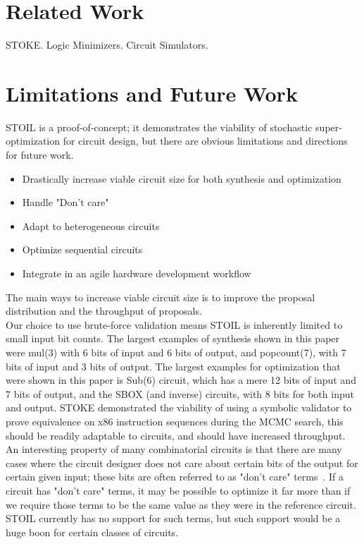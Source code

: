 \documentclass{article}
\begin{document}
\section{Related Work}
STOKE.
Logic Minimizers.
Circuit Simulators.


\section{Limitations and Future Work}

STOIL is a proof-of-concept; it demonstrates the viability of stochastic super-optimization for circuit design, but there are obvious limitations and directions for future work. 

\begin{itemize}
\item Drastically increase viable circuit size for both synthesis and optimization
\item Handle "Don't care"
\item Adapt to heterogeneous circuits
\item Optimize sequential circuits
\item Integrate in an agile hardware development workflow
\end{itemize}

The main ways to increase viable circuit size is to improve the proposal distribution and the throughput of proposals.\\
 
Our choice to use brute-force validation means STOIL is inherently limited to small input bit counts. The largest examples of synthesis shown in this paper were mul(3) with 6 bits of input and 6 bits of output, and popcount(7), with 7 bits of input and 3 bits of output. The largest examples for optimization that were shown in this paper is Sub(6) circuit, which has a mere 12 bits of input and 7 bits of output, and the SBOX (and inverse) circuits, with 8 bits for both input and output. STOKE demonstrated the viability of using a symbolic validator to prove equivalence on x86 instruction sequences during the MCMC search, this should be readily adaptable to circuits, and should have increased throughput. \\

An interesting property of many combinatorial circuits is that there are many cases where the circuit designer does not care about certain bits of the output for certain given input; these bits are often referred to as "don't care" terms~\cite{strong2013basic}. If a circuit has "don't care" terms, it may be possible to optimize it far more than if we require those terms to be the same value as they were in the reference circuit. STOIL currently has no support for such terms, but such support would be a huge boon for certain classes of circuits.\\
\end{document}
